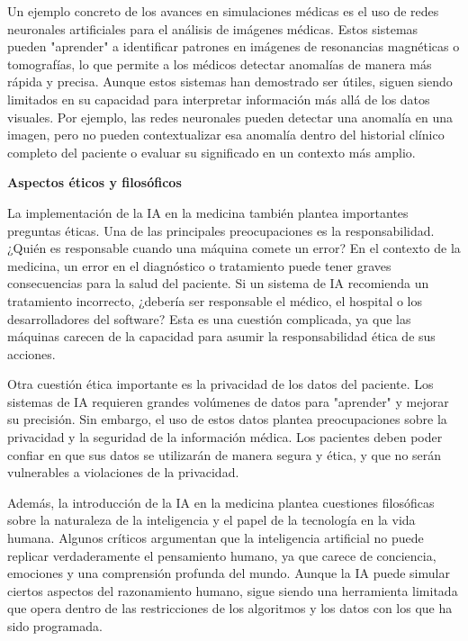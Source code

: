 \documentclass[a4paper,10pt]{article}
\begin{document}
Un ejemplo concreto de los avances en simulaciones médicas es el uso de redes neuronales artificiales para el análisis de imágenes médicas. Estos sistemas pueden "aprender" a identificar patrones en imágenes de resonancias magnéticas o tomografías, lo que permite a los médicos detectar anomalías de manera más rápida y precisa. Aunque estos sistemas han demostrado ser útiles, siguen siendo limitados en su capacidad para interpretar información más allá de los datos visuales. Por ejemplo, las redes neuronales pueden detectar una anomalía en una imagen, pero no pueden contextualizar esa anomalía dentro del historial clínico completo del paciente o evaluar su significado en un contexto más amplio.\vspace{1cm}

\textbf{Aspectos éticos y filosóficos}


La implementación de la IA en la medicina también plantea importantes preguntas éticas. Una de las principales preocupaciones es la responsabilidad. ¿Quién es responsable cuando una máquina comete un error? En el contexto de la medicina, un error en el diagnóstico o tratamiento puede tener graves consecuencias para la salud del paciente. Si un sistema de IA recomienda un tratamiento incorrecto, ¿debería ser responsable el médico, el hospital o los desarrolladores del software? Esta es una cuestión complicada, ya que las máquinas carecen de la capacidad para asumir la responsabilidad ética de sus acciones.\vspace{1cm}

Otra cuestión ética importante es la privacidad de los datos del paciente. Los sistemas de IA requieren grandes volúmenes de datos para "aprender" y mejorar su precisión. Sin embargo, el uso de estos datos plantea preocupaciones sobre la privacidad y la seguridad de la información médica. Los pacientes deben poder confiar en que sus datos se utilizarán de manera segura y ética, y que no serán vulnerables a violaciones de la privacidad.\vspace{1cm}

Además, la introducción de la IA en la medicina plantea cuestiones filosóficas sobre la naturaleza de la inteligencia y el papel de la tecnología en la vida humana. Algunos críticos argumentan que la inteligencia artificial no puede replicar verdaderamente el pensamiento humano, ya que carece de conciencia, emociones y una comprensión profunda del mundo. Aunque la IA puede simular ciertos aspectos del razonamiento humano, sigue siendo una herramienta limitada que opera dentro de las restricciones de los algoritmos y los datos con los que ha sido programada.
\end{document}
